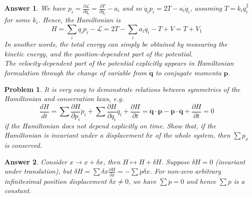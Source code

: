 \documentclass[a4paper]{article}
\newtheorem{ans}{Answer}[section]
\theoremstyle{new}
\newtheorem{qns}{Problem}[section]
\begin{document}
\begin{ans}
We have $p_i=\frac{\partial\mathcal{L}}{\partial\dot{q}_i}=\frac{\partial T}{\partial\dot{q}_i}-a_i$ and so $\dot{q}_ip_i=2T-a_i\dot{q}_i$, assuming $T=k_i\dot{q}_i^2$ for some $k_i$. Hence, the Hamiltonian is
$$H=\sum_i\dot{q}_ip_i-\mathcal{L}=2T-\sum_i a_i\dot{q}_i-T+V=T+V_1$$
In another words, the total energy can simply be obtained by measuring the kinetic energy, and the position-dependent part of the potential.\\[5pt]
The velocity-dependent part of the potential explicitly appears in Hamiltonian formulation through the change of variable from $\mathbf{\dot{q}}$ to conjugate momenta $\mathbf{p}$.
\end{ans}
\begin{qns}
It is very easy to demonstrate relations between symmetries of the Hamiltonian and conservation laws, e.g.
$$\frac{dH}{dt}=\sum\frac{\partial H}{\partial p_i}\dot{p}_i+\sum\frac{\partial H}{\partial q_i}\dot{q}_i+\frac{\partial H}{\partial t}=\mathbf{\dot{q}}\cdot\mathbf{\dot{p}}-\mathbf{\dot{p}}\cdot\mathbf{\dot{q}}+\frac{\partial H}{\partial t}=0$$
if the Hamiltonian does not depend explicitly on time. Show that, if the Hamiltonian is invariant under a displacement $\delta x$ of the whole system, then $\sum p_x$ is conserved.
\end{qns}
\begin{ans}
Consider $x\rightarrow x+\delta x$, then $H\mapsto H+\delta H$. Suppose $\delta H=0$ (invariant under translation), but $\delta H=\sum\delta x\frac{\partial H}{\partial x}=-\sum\dot{p}\delta x$. For non-zero arbitrary infinitesimal position displacement $\delta x\neq 0$, we have $\sum\dot{p}=0$ and hence $\sum p$ is a constant.
\end{ans}
\newpage
\end{document}
